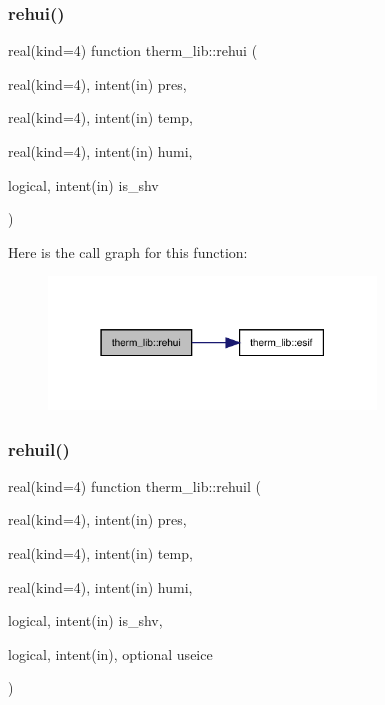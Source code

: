 \mbox{\label{namespacetherm__lib_a897c8c9126106d615513b59bf83c2dca}} 
\subsubsection{\texorpdfstring{rehui()}{rehui()}}
{\footnotesize\ttfamily real(kind=4) function therm\+\_\+lib\+::rehui (\begin{DoxyParamCaption}\item[{real(kind=4), intent(in)}]{pres,  }\item[{real(kind=4), intent(in)}]{temp,  }\item[{real(kind=4), intent(in)}]{humi,  }\item[{logical, intent(in)}]{is\+\_\+shv }\end{DoxyParamCaption})}

Here is the call graph for this function\+:
\nopagebreak
\begin{figure}[H]
\begin{center}
\leavevmode
\includegraphics[width=247pt]{namespacetherm__lib_a897c8c9126106d615513b59bf83c2dca_cgraph}
\end{center}
\end{figure}
\mbox{\label{namespacetherm__lib_a41cd91c2aa39b6b956a791e3260e27e2}} 
\subsubsection{\texorpdfstring{rehuil()}{rehuil()}}
{\footnotesize\ttfamily real(kind=4) function therm\+\_\+lib\+::rehuil (\begin{DoxyParamCaption}\item[{real(kind=4), intent(in)}]{pres,  }\item[{real(kind=4), intent(in)}]{temp,  }\item[{real(kind=4), intent(in)}]{humi,  }\item[{logical, intent(in)}]{is\+\_\+shv,  }\item[{logical, intent(in), optional}]{useice }\end{DoxyParamCaption})}

